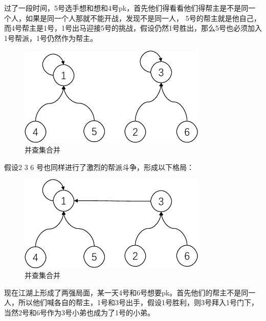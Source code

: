 \documentclass[lang=cn,newtx,10pt,scheme=chinese]{elegantbook}
\begin{document}
过了一段时间，5号选手想和想和4号pk，首先他们得看看他们得帮主是不是同一个人，如果是同一个人那就不能开战，发现不是同一人，
5号的帮主就是他自己，而4号帮主是1号，1号出马迎接5号的挑战，假设仍然1号胜出，那么5号也必须加入1号帮派，1号仍然作为帮主。

\begin{figure}[h!]
  \centering
  \includegraphics[width=0.8\textwidth]{./figure/pdf/cropped/unionFindExample(c).pdf}
  \caption{并查集合并}
  \label{fig:unionFind3}
\end{figure}

假设2 3 6 号也同样进行了激烈的帮派斗争，形成以下格局：

\begin{figure}[h!]
  \centering
  \includegraphics[width=0.8\textwidth]{./figure/pdf/cropped/unionFindExample(d).pdf}
  \caption{并查集合并}
  \label{fig:unionFind4}
\end{figure}

现在江湖上形成了两强局面，某一天4号和6号想要pk。首先他们的帮主不是同一人，所以他们喊各自的帮主，1号和3号出手，假设1号胜利，则3号拜入1号门下，当然2号和6号作为3号小弟也成为了1号的小弟。
\end{document}
